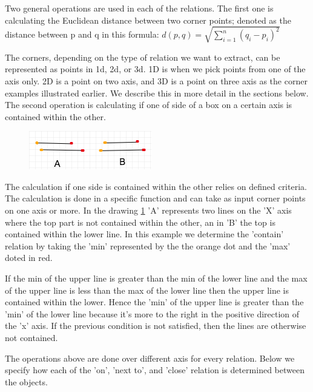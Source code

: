 Two general operations are used in each of the relations. The first one is calculating  the Euclidean distance between two corner points; denoted as the distance between p and q in this formula:  \begin{math}
 d\left( p,q\right)   = \sqrt {\sum _{i=1}^{n}  \left( q_{i}-p_{i}\right)^2 } 
 \end{math}

The corners, depending on the type of relation we want to extract, can be represented as points in  1d, 2d, or 3d. 1D is  when we pick points from one of the axis only. 2D is a point on two axis, and 3D is a point on three axis as the corner examples illustrated earlier. We describe this in more detail in the sections below. The second operation is calculating if one of side of a box on a certain axis is contained within the other. 

\begin{figure}[H]
\includegraphics[scale=0.5]{images/contained.png}
\caption{}
\label{fig:contained}
\end{figure}

The calculation if one side is contained within the other relies on defined criteria. The calculation is done in a specific function and  can take as input  corner points on one axis or more. In the drawing \ref{fig:contained} 'A' represents two lines on the 'X' axis where the top part is not contained within the other, an in 'B' the top is contained within the lower line. In this example we determine the 'contain' relation by taking the 'min' represented by the the orange dot and the 'max' doted in red. 

If the min of the upper line is greater than the min of the lower line and the max of the upper line is less than the max of the lower line then the upper line is contained within the lower. Hence the 'min' of the upper line is greater than the 'min' of the lower line because it's more to the right in the positive direction of the 'x' axis. If the previous condition is not satisfied, then the lines are otherwise not contained. 


The operations above are done over different axis for every relation. Below we specify how each of the 'on', 'next to', and 'close' relation is determined between the objects. 

